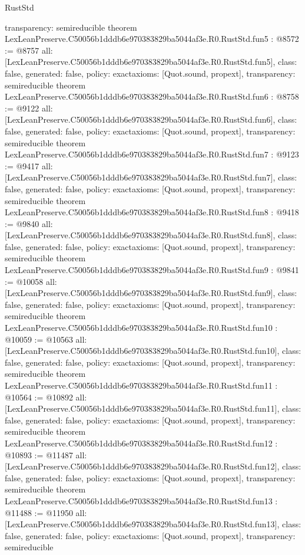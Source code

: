 \begin{lexlean}{RustStd}
\begin{coremodule}
{  transparency: semireducible
}
theorem LexLeanPreserve.C50056b1dddb6e970383829ba5044af3e.R0.RustStd.fun5 : @8572 := @8757 {
  all: [LexLeanPreserve.C50056b1dddb6e970383829ba5044af3e.R0.RustStd.fun5],
  class: false,
  generated: false,
  policy: exact{axioms: [Quot.sound, propext]},
  transparency: semireducible
}
theorem LexLeanPreserve.C50056b1dddb6e970383829ba5044af3e.R0.RustStd.fun6 : @8758 := @9122 {
  all: [LexLeanPreserve.C50056b1dddb6e970383829ba5044af3e.R0.RustStd.fun6],
  class: false,
  generated: false,
  policy: exact{axioms: [Quot.sound, propext]},
  transparency: semireducible
}
theorem LexLeanPreserve.C50056b1dddb6e970383829ba5044af3e.R0.RustStd.fun7 : @9123 := @9417 {
  all: [LexLeanPreserve.C50056b1dddb6e970383829ba5044af3e.R0.RustStd.fun7],
  class: false,
  generated: false,
  policy: exact{axioms: [Quot.sound, propext]},
  transparency: semireducible
}
theorem LexLeanPreserve.C50056b1dddb6e970383829ba5044af3e.R0.RustStd.fun8 : @9418 := @9840 {
  all: [LexLeanPreserve.C50056b1dddb6e970383829ba5044af3e.R0.RustStd.fun8],
  class: false,
  generated: false,
  policy: exact{axioms: [Quot.sound, propext]},
  transparency: semireducible
}
theorem LexLeanPreserve.C50056b1dddb6e970383829ba5044af3e.R0.RustStd.fun9 : @9841 := @10058 {
  all: [LexLeanPreserve.C50056b1dddb6e970383829ba5044af3e.R0.RustStd.fun9],
  class: false,
  generated: false,
  policy: exact{axioms: [Quot.sound, propext]},
  transparency: semireducible
}
theorem LexLeanPreserve.C50056b1dddb6e970383829ba5044af3e.R0.RustStd.fun10 : @10059 := @10563 {
  all: [LexLeanPreserve.C50056b1dddb6e970383829ba5044af3e.R0.RustStd.fun10],
  class: false,
  generated: false,
  policy: exact{axioms: [Quot.sound, propext]},
  transparency: semireducible
}
theorem LexLeanPreserve.C50056b1dddb6e970383829ba5044af3e.R0.RustStd.fun11 : @10564 := @10892 {
  all: [LexLeanPreserve.C50056b1dddb6e970383829ba5044af3e.R0.RustStd.fun11],
  class: false,
  generated: false,
  policy: exact{axioms: [Quot.sound, propext]},
  transparency: semireducible
}
theorem LexLeanPreserve.C50056b1dddb6e970383829ba5044af3e.R0.RustStd.fun12 : @10893 := @11487 {
  all: [LexLeanPreserve.C50056b1dddb6e970383829ba5044af3e.R0.RustStd.fun12],
  class: false,
  generated: false,
  policy: exact{axioms: [Quot.sound, propext]},
  transparency: semireducible
}
theorem LexLeanPreserve.C50056b1dddb6e970383829ba5044af3e.R0.RustStd.fun13 : @11488 := @11950 {
  all: [LexLeanPreserve.C50056b1dddb6e970383829ba5044af3e.R0.RustStd.fun13],
  class: false,
  generated: false,
  policy: exact{axioms: [Quot.sound, propext]},
  transparency: semireducible
}
\end{coremodule}
\end{lexlean}
